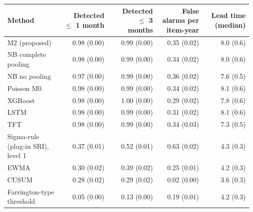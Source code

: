 \documentclass[10pt,a4paper]{article}
\begin{document}
\vspace{6pt}
\noindent\begin{minipage}{\linewidth}
\centering\footnotesize
\begin{tabular}{lrrrr}
\toprule
Method & Detected $\le$ 1 month & Detected $\le$ 3 months & False alarms per item-year & Lead time (median) \\ \midrule
M2 (proposed) & 0.98 (0.00) & 0.99 (0.00) & 0.35 (0.02) & 8.0 (0.6) \\
NB complete pooling & 0.98 (0.00) & 0.99 (0.00) & 0.34 (0.02) & 8.0 (0.6) \\
NB no pooling & 0.97 (0.00) & 0.99 (0.00) & 0.36 (0.02) & 7.6 (0.5) \\
Poisson M0 & 0.98 (0.00) & 0.99 (0.00) & 0.34 (0.02) & 8.1 (0.6) \\
XGBoost & 0.98 (0.00) & 1.00 (0.00) & 0.29 (0.02) & 7.8 (0.6) \\
LSTM & 0.98 (0.00) & 0.99 (0.00) & 0.31 (0.02) & 8.1 (0.6) \\
TFT & 0.98 (0.00) & 0.99 (0.00) & 0.34 (0.03) & 7.3 (0.5) \\
Sigma-rule (plug-in SRI), level 1 & 0.37 (0.01) & 0.52 (0.01) & 0.63 (0.02) & 4.3 (0.3) \\
EWMA & 0.30 (0.02) & 0.39 (0.02) & 0.25 (0.01) & 4.2 (0.3) \\
CUSUM & 0.28 (0.02) & 0.29 (0.02) & 0.02 (0.00) & 3.6 (0.3) \\
Farrington-type threshold & 0.05 (0.00) & 0.13 (0.00) & 0.19 (0.01) & 4.2 (0.3) \\
\bottomrule
\end{tabular}
\end{minipage}
\vspace{8pt}
\end{document}

